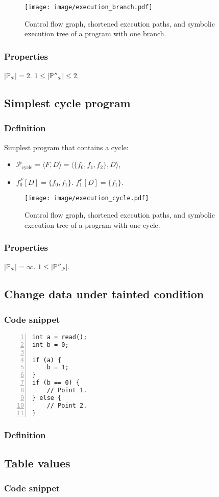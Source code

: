 \documentclass[fleqn,oneside,a4]{article}
\newcommand{\sublevel}{\subsection}
\newcommand{\subsublevel}{\subsubsection}
\begin{document}
\begin{figure}[h!]
    \begin{center}
        \texttt{[image: image/execution\_branch.pdf]}
    \end{center}
    \caption{Control flow graph, shortened execution paths,
        and symbolic execution tree of a program with one branch.}
\end{figure}

\subsublevel{Properties}

$|\mathds{P}_\mathcal{P}| = 2$.
$1 \le |\mathds{P}''_\mathcal{P}| \le 2$.

\sublevel{Simplest cycle program}

\subsublevel{Definition}

Simplest program that contains a cycle:
\begin{itemize}
    \item $\mathcal{P}_{\text{cycle}} = \langle F, D \rangle =
        \langle \{f_0, f_1, f_2\}, D \rangle$,
    \item $f_0^F[D] = \{f_0, f_1\}$. $f_1^F[D] = \{f_1\}$.
\end{itemize}

\begin{figure}[h!]
    \begin{center}
        \texttt{[image: image/execution\_cycle.pdf]}
    \end{center}
    \caption{Control flow graph, shortened execution paths,
        and symbolic execution tree of a program with one cycle.}
\end{figure}

\subsublevel{Properties}

$|\mathds{P}_\mathcal{P}| = \infty$.
$1 \le |\mathds{P}''_\mathcal{P}|$.

\sublevel{Change data under tainted condition}

\subsublevel{Code snippet}

\begin{lstlisting}[numbers=left,numberstyle=\scriptsize]
int a = read();
int b = 0;

if (a) {
    b = 1;
}
if (b == 0) {
    // Point 1.
} else {
    // Point 2.
}
\end{lstlisting}

\subsublevel{Definition}

\sublevel{Table values}

\subsublevel{Code snippet}
\end{document}
